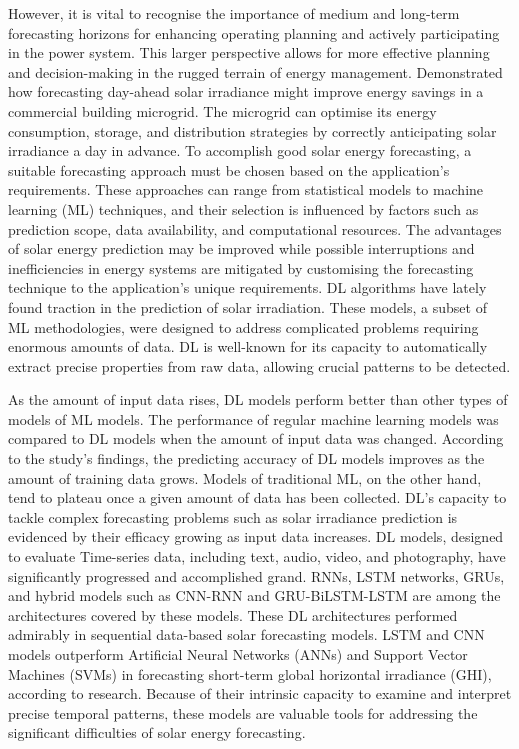 \documentclass[a4paper,fleqn]{cas-sc}
\begin{document}
However, it is vital to recognise the importance of medium and long-term forecasting horizons for enhancing operating planning and actively participating in the power system. This larger perspective allows for more effective planning and decision-making in the rugged terrain of energy management. Demonstrated how forecasting day-ahead solar irradiance might improve energy savings in a commercial building microgrid. The microgrid can optimise its energy consumption, storage, and distribution strategies by correctly anticipating solar irradiance a day in advance. To accomplish good solar energy forecasting, a suitable forecasting approach must be chosen based on the application's requirements. These approaches can range from statistical models to machine learning (ML) techniques, and their selection is influenced by factors such as prediction scope, data availability, and computational resources. The advantages of solar energy prediction may be improved while possible interruptions and inefficiencies in energy systems are mitigated by customising the forecasting technique to the application's unique requirements. DL algorithms have lately found traction in the prediction of solar irradiation. These models, a subset of ML methodologies, were designed to address complicated problems requiring enormous amounts of data. DL is well-known for its capacity to automatically extract precise properties from raw data, allowing crucial patterns to be detected\cite{husein2019day}.

As the amount of input data rises, DL models perform better than other types of models of ML models. The performance of regular machine learning models was compared to DL models when the amount of input data was changed. According to the study's findings, the predicting accuracy of DL models improves as the amount of training data grows\cite{rajagukguk2020review}. Models of traditional ML, on the other hand, tend to plateau once a given amount of data has been collected. DL's capacity to tackle complex forecasting problems such as solar irradiance prediction is evidenced by their efficacy growing as input data increases. DL models, designed to evaluate Time-series data, including text, audio, video, and photography, have significantly progressed and accomplished grand. RNNs, LSTM networks, GRUs, and hybrid models such as CNN-RNN and GRU-BiLSTM-LSTM are among the architectures covered by these models. These DL architectures performed admirably in sequential data-based solar forecasting models. LSTM and CNN models outperform Artificial Neural Networks (ANNs) and Support Vector Machines (SVMs) in forecasting short-term global horizontal irradiance (GHI), according to research. Because of their intrinsic capacity to examine and interpret precise temporal patterns, these models are valuable tools for addressing the significant difficulties of solar energy forecasting\cite{zang2020short}.
\end{document}
